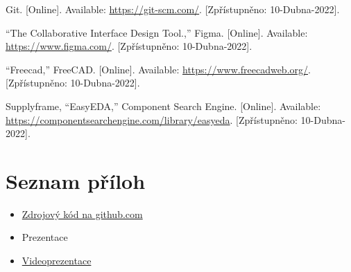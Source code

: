 \documentclass[12pt,a4paper]{article}
\begin{document}
\begin{thebibliography}{9}
	Git. [Online]. Available: \href{https://git-scm.com/}{https://git-scm.com/}. [Zpřístupněno: 10-Dubna-2022]. 

	“The Collaborative Interface Design Tool.,” Figma. [Online]. Available: \href{https://www.figma.com/}{https://www.figma.com/}. [Zpřístupněno: 10-Dubna-2022]. 

	“Freecad,” FreeCAD. [Online]. Available: \href{https://www.freecadweb.org/}{https://www.freecadweb.org/}. [Zpřístupněno: 10-Dubna-2022]. 

	Supplyframe, “EasyEDA,” Component Search Engine. [Online]. Available: \href{https://componentsearchengine.com/library/easyeda}{https://componentsearchengine.com/library/easyeda}. [Zpřístupněno: 10-Dubna-2022]. 
\end{thebibliography}

\section{Seznam příloh}

\begin{itemize}
	\item \href{https://github.com/POJFM/dmp-plant-hub}{Zdrojový kód na
		      github.com}
	\item Prezentace
	\item

	      \href{https://www.youtube.com/watch?v=oo2_pDX5OE4}{Videoprezentace}
\end{itemize}
\end{document}
